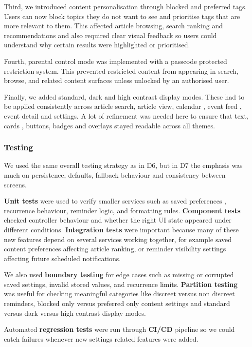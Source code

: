 \documentclass[a4paper, 12pt]{article}
\begin{document}
    Third, we introduced content personalisation through blocked and preferred
    tags. Users can now block topics they do not want to see and prioritise tags
    that are more relevant to them. This affected article browsing, search ranking
    and recommendations and also required clear visual feedback so users could understand
    why certain results were highlighted or prioritised.

    Fourth, parental control mode was implemented with a passcode protected
    restriction system. This prevented restricted content from appearing in search,
    browse, and related content surfaces unless unlocked by an authorised user.

    Finally, we added standard, dark and high contrast display modes. These had
    to be applied consistently across article search, article view, calendar ,
    event feed , event detail and settings. A lot of refinement was needed here to
    ensure that text, cards , buttons, badges and overlays stayed readable across
    all themes.
    \subsubsection{Testing}
    We used the same overall testing strategy as in D6, but in D7 the emphasis was
    much on persistence, defaults, fallback behaviour and consistency between screens.

    \textbf{Unit tests} were used to verify smaller services such as saved
    preferences , recurrence behaviour, reminder logic, and formatting rules. \textbf{Component
    tests} checked controller behaviour and whether the right UI state appeared
    under different conditions. \textbf{Integration tests} were important
    because many of these new features depend on several services working
    together, for example saved content preferences affecting article ranking,
    or reminder visibility settings affecting future scheduled notifications.

    We also used \textbf{boundary testing} for edge cases such as missing or corrupted
    saved settings, invalid stored values, and recurrence limits. \textbf{Partition
    testing} was useful for checking meaningful categories like discreet versus non
    discreet reminders, blocked only versus preferred only content settings and
    standard versus dark versus high contrast display modes.

    Automated \textbf{regression tests} were run through \textbf{CI/CD} pipeline
    so we could catch failures whenever new settings related features were added.
\end{document}
